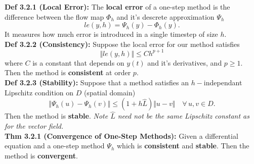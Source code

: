 \documentclass[10pt,a4paper]{article}
\newcommand{\norm}[1]{\Vert #1 \Vert}
\begin{document}
\begin{multicols*}{2}
\textbf{Def 3.2.1 (Local Error):} The \textbf{local error} of a one-step method is the difference between the flow map $\Phi_h$ and it's descrete approximation $\Psi_h$ \[
le(y, h) = \Psi_h(y) - \Phi_h(y).
\] It measures how much error is introduced in a single timestep of size $h$.\\

\textbf{Def 3.2.2 (Consistency):} Suppose the local error for our method satisfies \[
\Vert le(y, h) \Vert \leq Ch^{p + 1}
\] where $C$ is a constant that depends on $y(t)$ and it's derivatives, and $p \geq 1$. Then the method is \textbf{consistent} at order $p$.\\

\textbf{Def 3.2.3 (Stability):} Suppose that a method satisfies an $h-$independant Lipschitz condition on $D$ (spatial domain) \[
\norm{\Psi_h(u) - \Psi_h(v)} \leq (1 + h\hat L)\norm{u - v} \quad \forall\, u, v \in D.
\] Then the method is \textbf{stable}. \textit{Note $\hat L$ need not be the same Lipschitz constant as for the vector field.}\\

\textbf{Thm 3.2.1 (Convergence of One-Step Methods):} Given a differential equation and a one-step method $\Psi_h$ which is \textbf{consistent} and \textbf{stable}. Then the method is \textbf{convergent}.\\


\end{multicols*}
\end{document}
